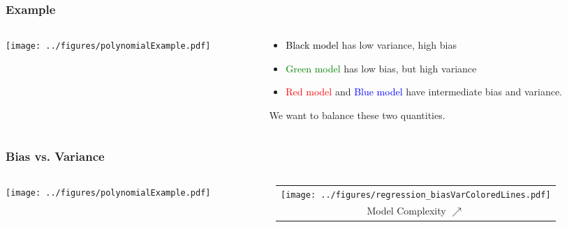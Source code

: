 \documentclass{beamer}
\begin{document}
\begin{frame}
\frametitle{Example}
\begin{columns}[T]
    \begin{column}{.55\textwidth}
  \texttt{[image: ../figures/polynomialExample.pdf]}
  \end{column}
    \begin{column}{.45\textwidth}
 \begin{itemize}
 \item \textcolor{black}{Black model} has low variance, high bias
 \item \textcolor{green}{Green model} has low bias, but high variance
 \item \textcolor{red}{Red model} and \textcolor{blue}{Blue model} have intermediate
 bias and variance.
 \end{itemize}
\vsp

We want to balance these two quantities.
    \end{column}
  \end{columns}
\end{frame}

\begin{frame}
\frametitle{Bias vs. Variance}
\begin{columns}[T]
    \begin{column}{.5\textwidth}
  \texttt{[image: ../figures/polynomialExample.pdf]}
  \end{column}
    \begin{column}{.5\textwidth}
    \begin{tabular}{c}
  \texttt{[image: ../figures/regression\_biasVarColoredLines.pdf]}   \\
  {\footnotesize Model Complexity $\nearrow$}
  \end{tabular}
   \end{column}
  \end{columns}
\vsp

\end{frame}

\end{document}
